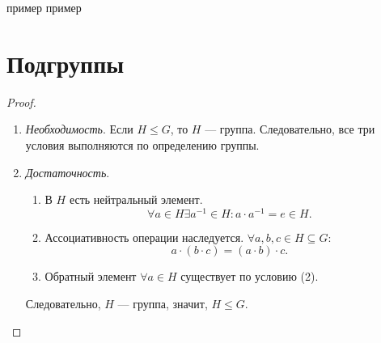 \documentclass[12pt,a4paper]{report}
\begin{document}
пример
пример

\section{Подгруппы}



\begin{proof}
    \begin{enumerate}
        \item[$\Longrightarrow$] \textit{Необходимость}. 
        Если $H\leq G$, то $H$ — группа. Следовательно, все три условия выполняются по определению группы.
        
        \item[$\Longleftarrow$] \textit{Достаточность}. 
        \begin{enumerate}
            \item В $H$ есть нейтральный элемент. \[
            \forall a\in H \exists a^{-1}\in H \colon a\cdot a^{-1}=e\in H. 
            \]
            
            \item Ассоциативность операции наследуется. $\forall a,b,c \in H\subseteq G\colon$
            \[
            a\cdot (b\cdot c)=(a\cdot b)\cdot c.
            \]
            \item Обратный элемент $\forall a\in H$ существует по условию (2).
        \end{enumerate}
        Следовательно, $H$ — группа, значит, $H\leq G$.
    \end{enumerate}
\end{proof}
\end{document}
